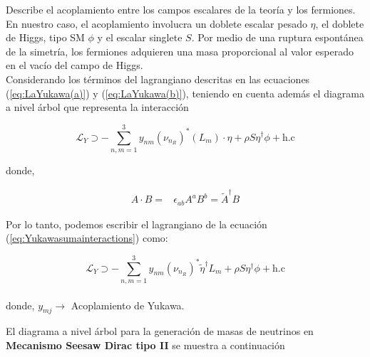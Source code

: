 \documentclass[12pt]{article}
\begin{document}
Describe el acoplamiento entre los campos escalares de la teoría y los fermiones. En nuestro caso, el acoplamiento involucra un doblete escalar pesado $\eta$, el doblete de Higgs, tipo SM $\phi$ y el escalar singlete $S$. Por medio de una ruptura espontánea de la simetría, los fermiones adquieren una masa proporcional al valor esperado en el vacío del campo de Higgs. \\

Considerando los términos del lagrangiano descritas en las ecuaciones (\ref{eq:LaYukawa(a)}) y (\ref{eq:LaYukawa(b)}), teniendo en cuenta además el diagrama a nivel árbol que representa la interacción 

\begin{equation}
    \label{eq:Yukawasumainteractions}
    \mathcal{L}_Y \supset   -\sum_{n,m=1}^3 y_{nm} ({\nu_{n_R}})^* ({L_m})\cdot \eta + \rho S\eta^\dagger\phi + \text{h.c}
\end{equation}

donde, 

\begin{align}
    \label{eq:cot}
    A\cdot B=&\epsilon_{ab}A^a B^b =\widetilde{A}^\dagger B
\end{align}

Por lo tanto, podemos escribir el lagrangiano de la ecuación  (\ref{eq:Yukawasumainteractions}) como:

\begin{equation}
    \label{eq:Weilalternativo}
    \mathcal{L}_Y \supset    -\sum_{n,m=1}^3 y_{nm} ({\nu_{n_R}})^* \widetilde{\eta}^\dagger {L_m}+ \rho S\eta^\dagger\phi + \text{h.c}
\end{equation} \\

donde, $y_{mj} \rightarrow $ Acoplamiento de Yukawa. 

El diagrama a nivel árbol para la generación de masas de neutrinos en \textbf{Mecanismo Seesaw Dirac tipo II} se muestra a continuación 
\end{document}
